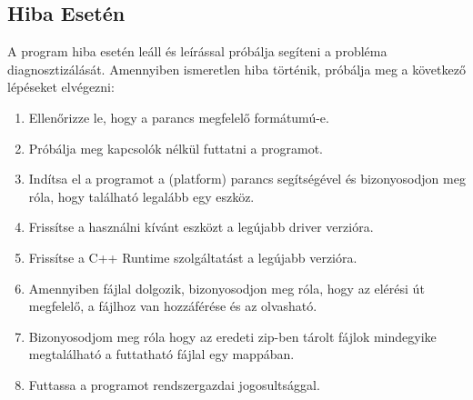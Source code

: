 \subsection{Hiba Esetén}

A program hiba esetén leáll és leírással próbálja segíteni a probléma diagnosztizálását. Amennyiben ismeretlen hiba történik, próbálja meg a következő lépéseket elvégezni:
%
\begin{enumerate}
    \item Ellenőrizze le, hogy a parancs megfelelő formátumú-e.
    \item Próbálja meg kapcsolók nélkül futtatni a programot.
    \item Indítsa el a programot a (platform) parancs segítségével és bizonyosodjon meg róla, hogy található legalább egy eszköz.
    \item Frissítse a használni kívánt eszközt a legújabb driver verzióra.
    \item Frissítse a C++ Runtime szolgáltatást a legújabb verzióra.
    \item Amennyiben fájlal dolgozik, bizonyosodjon meg róla, hogy az elérési út megfelelő, a fájlhoz van hozzáférése és az olvasható.
    \item Bizonyosodjom meg róla hogy az eredeti zip-ben tárolt fájlok mindegyike megtalálható a futtatható fájlal egy mappában.
    \item Futtassa a programot rendszergazdai jogosultsággal.
\end{enumerate}